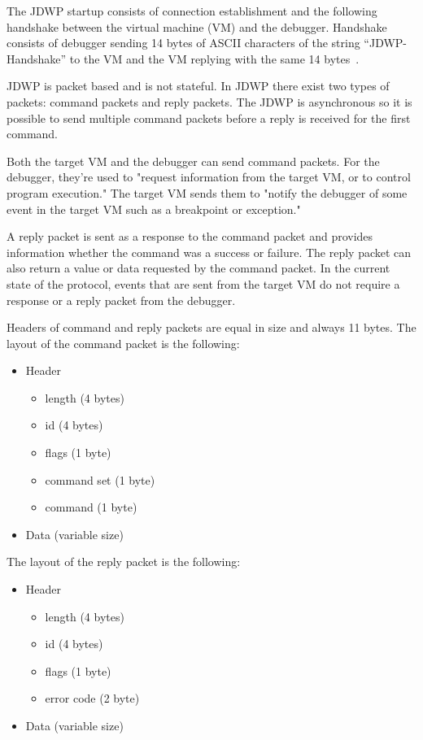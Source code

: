 \documentclass[..thesis.tex]{subfiles}
\begin{document}
% 
% 
The JDWP startup consists of connection establishment and the following handshake between the virtual machine (VM) and the debugger.
Handshake consists of debugger sending 14 bytes of ASCII characters of the string \enquote{JDWP-Handshake} to the VM and the VM replying with the same 14 bytes~\cite{oracle_jdwp_spec}.

JDWP is packet based and is not stateful. In JDWP there exist two types of packets: command packets and reply packets.
The JDWP is asynchronous so it is possible to send multiple command packets before a reply is received for the first command.

Both the target VM and the debugger can send command packets. For the debugger, they're used to "request information from the target VM, or to control program execution."
The target VM sends them to "notify the debugger of some event in the target VM such as a breakpoint or exception."\cite{oracle_jdwp_spec}

A reply packet is sent as a response to the command packet and provides information whether the command was a success or failure. The reply packet can also return a value or data requested by the command packet. In the current state of the protocol, events that are sent from the target VM do not require a response or a reply packet from the debugger.\cite{oracle_jdwp_spec}

Headers of command and reply packets are equal in size and always 11 bytes. The layout of the command packet is the following:
\begin{itemize}[nosep]
  \item Header
    \begin{itemize}[nosep]
      \item length (4 bytes)
      \item id (4 bytes)
      \item flags (1 byte)
      \item command set (1 byte)
      \item command (1 byte)
    \end{itemize}
  \item Data (variable size) 
\end{itemize}

The layout of the reply packet is the following:
\begin{itemize}[nosep]
  \item Header
    \begin{itemize}[nosep]
      \item length (4 bytes)
      \item id (4 bytes)
      \item flags (1 byte)
      \item error code (2 byte)
    \end{itemize}
  \item Data (variable size) 
\end{itemize}
\end{document}
